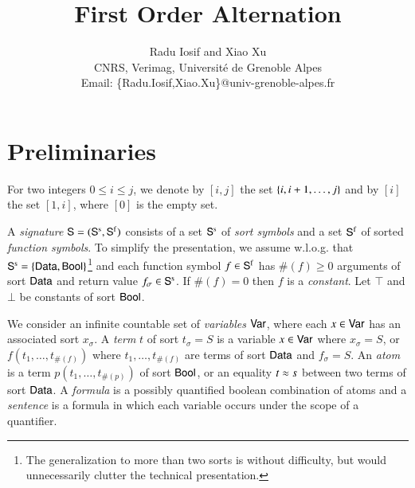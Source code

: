 \documentclass{llncs}
\begin{document}

\title{First Order Alternation}

\author{Radu Iosif and Xiao Xu \\
CNRS, Verimag, Universit\'e de Grenoble Alpes \\
Email: \{Radu.Iosif,Xiao.Xu\}@univ-grenoble-alpes.fr}

\maketitle

\begin{abstract}
\end{abstract}

\section{Preliminaries}

For two integers $0 \leq i \leq j$, we denote by $[i,j]$ the set
$\{ i,i+1,\ldots,j \}$ and by $[i]$ the set $[1,i]$, where $[0]$ is
the empty set.

A \emph{signature} $\mathsf{S} = (\mathsf{S}^\mathrm{s},\mathsf{S}^\mathrm{f})$ consists of a
set $\mathsf{S}^\mathrm{s}$ of \emph{sort symbols} and a set $\mathsf{S}^\mathrm{f}$ of
sorted \emph{function symbols}. To simplify the presentation, we
assume w.l.o.g. that $\mathsf{S}^\mathrm{s} = \{ \mathsf{Data},\mathsf{Bool} \}$\footnote{The
  generalization to more than two sorts is without difficulty, but
  would unnecessarily clutter the technical presentation.} and each
function symbol $f \in \mathsf{S}^\mathrm{f}$ has $\#(f) \geq 0$ arguments of
sort $\mathsf{Data}$ and return value $f_\sigma \in \mathsf{S}^\mathrm{s}$. If
$\#(f)=0$ then $f$ is a \emph{constant}. Let $\top$ and $\bot$ be
constants of sort $\mathsf{Bool}$. 


We consider an infinite countable set of \emph{variables} $\mathsf{Var}$,
where each $x \in \mathsf{Var}$ has an associated sort $x_\sigma$. A
\emph{term} $t$ of sort $t_\sigma = S$ is a variable $x \in \mathsf{Var}$
where $x_\sigma=S$, or $f(t_1,\ldots,t_{\#(f)})$ where
$t_1,\ldots,t_{\#(f)}$ are terms of sort $\mathsf{Data}$ and $f_\sigma=S$. An
\emph{atom} is a term $p(t_1,\ldots,t_{\#(p)})$ of sort $\mathsf{Bool}$, or an
equality $t \approx s$ between two terms of sort $\mathsf{Data}$. A
\emph{formula} is a possibly quantified boolean combination of atoms
and a \emph{sentence} is a formula in which each variable occurs under
the scope of a quantifier.
\end{document}
